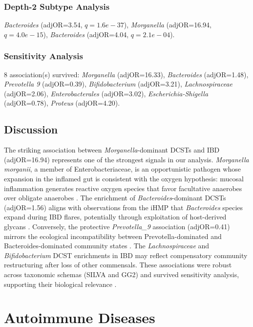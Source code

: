 \documentclass[11pt,a4paper]{article}
\begin{document}
\subsubsection{Depth-2 Subtype Analysis}
\textit{Bacteroides} (adjOR=3.54, $q=1.6e-37$), \textit{Morganella} (adjOR=16.94, $q=4.0e-15$), \textit{Bacteroides} (adjOR=4.04, $q=2.1e-04$).

\subsubsection{Sensitivity Analysis}
8 association(s) survived: \textit{Morganella} (adjOR=16.33), \textit{Bacteroides} (adjOR=1.48), \textit{Prevotella 9} (adjOR=0.39), \textit{Bifidobacterium} (adjOR=3.21), \textit{Lachnospiraceae} (adjOR=2.06), \textit{Enterobacterales} (adjOR=3.02), \textit{Escherichia-Shigella} (adjOR=0.78), \textit{Proteus} (adjOR=4.20).

\subsection{Discussion}
The striking association between \textit{Morganella}-dominant DCSTs and IBD (adjOR=16.94) represents one of the strongest signals in our analysis. \textit{Morganella morganii}, a member of Enterobacteriaceae, is an opportunistic pathogen whose expansion in the inflamed gut is consistent with the oxygen hypothesis: mucosal inflammation generates reactive oxygen species that favor facultative anaerobes over obligate anaerobes \cite{Sartor2008_IBD,Frank2007_IBD}. The enrichment of \textit{Bacteroides}-dominant DCSTs (adjOR=1.56) aligns with observations from the iHMP that \textit{Bacteroides} species expand during IBD flares, potentially through exploitation of host-derived glycans \cite{LloydPrice2019_IBD}. Conversely, the protective \textit{Prevotella\_9} association (adjOR=0.41) mirrors the ecological incompatibility between Prevotella-dominated and Bacteroides-dominated community states \cite{Arumugam2011_enterotypes}. The \textit{Lachnospiraceae} and \textit{Bifidobacterium} DCST enrichments in IBD may reflect compensatory community restructuring after loss of other commensals. These associations were robust across taxonomic schemas (SILVA and GG2) and survived sensitivity analysis, supporting their biological relevance \cite{Gevers2014_CD}.
\newpage

\section{Autoimmune Diseases}
\end{document}
